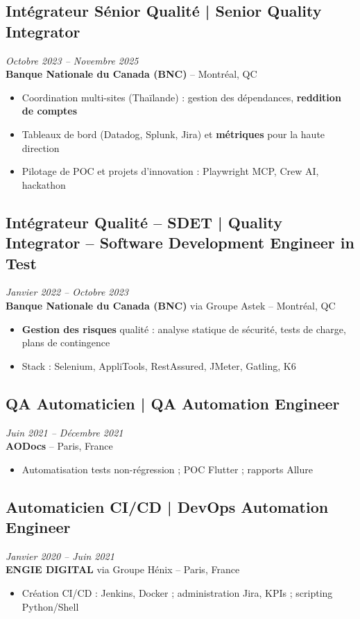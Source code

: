 \documentclass[11pt,a4paper]{article}
\begin{document}
\subsection*{Intégrateur Sénior Qualité | Senior Quality Integrator} \hfill \textit{Octobre 2023 -- Novembre 2025}\\
\textbf{Banque Nationale du Canada (BNC)} -- Montréal, QC
\begin{itemize}
    \item Coordination multi-sites (Thaïlande) : gestion des dépendances, \textbf{reddition de comptes}
    \item Tableaux de bord (Datadog, Splunk, Jira) et \textbf{métriques} pour la haute direction
    \item Pilotage de POC et projets d'innovation : Playwright MCP, Crew AI, hackathon
\end{itemize}

\subsection*{Intégrateur Qualité -- SDET | Quality Integrator -- Software Development Engineer in Test} \hfill \textit{Janvier 2022 -- Octobre 2023}\\
\textbf{Banque Nationale du Canada (BNC)} via Groupe Astek -- Montréal, QC
\begin{itemize}
    \item \textbf{Gestion des risques} qualité : analyse statique de sécurité, tests de charge, plans de contingence
    \item Stack : Selenium, AppliTools, RestAssured, JMeter, Gatling, K6
\end{itemize}

\subsection*{QA Automaticien | QA Automation Engineer} \hfill \textit{Juin 2021 -- Décembre 2021}\\
\textbf{AODocs} -- Paris, France
\begin{itemize}
    \item Automatisation tests non-régression ; POC Flutter ; rapports Allure
\end{itemize}

\subsection*{Automaticien CI/CD | DevOps Automation Engineer} \hfill \textit{Janvier 2020 -- Juin 2021}\\
\textbf{ENGIE DIGITAL} via Groupe Hénix -- Paris, France
\begin{itemize}
    \item Création CI/CD : Jenkins, Docker ; administration Jira, KPIs ; scripting Python/Shell
\end{itemize}
\end{document}

